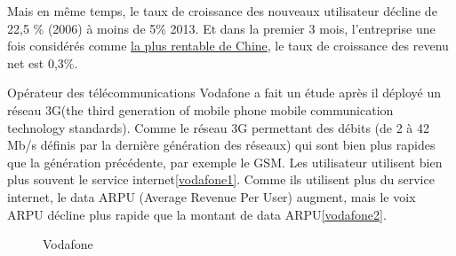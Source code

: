 Mais en même temps, le taux de croissance des nouveaux utilisateur décline de 22,5 \% (2006) à moins de 5\% 2013. Et dans la premier 3 mois, l'entreprise une fois considérés comme \href{http://www.marketing-chine.com/entreprises-chinoises/le-top-50-des-marques-chinoises}{la plus rentable de Chine}, le taux de croissance des revenu net est 0,3\%.

Opérateur des télécommunications Vodafone a fait un étude après il déployé un réseau 3G(\textsf{the third generation of mobile phone mobile communication technology standards}). Comme le réseau 3G permettant des débits (de 2 à 42 Mb/s définis par la dernière génération des réseaux) qui sont bien plus rapides que la génération précédente, par exemple le GSM. Les utilisateur utilisent bien plus souvent le service internet\ref{vodafone1}. Comme ils utilisent plus du service internet, le data ARPU (Average Revenue Per User) augment, mais le voix ARPU décline plus rapide que la montant de data ARPU\ref{vodafone2}. 
 \begin{figure}[H]
 	\flushleft
 	 	\hfill
 	\hspace{1in}	 
 	\caption{Vodafone} 
 \end{figure}
   
